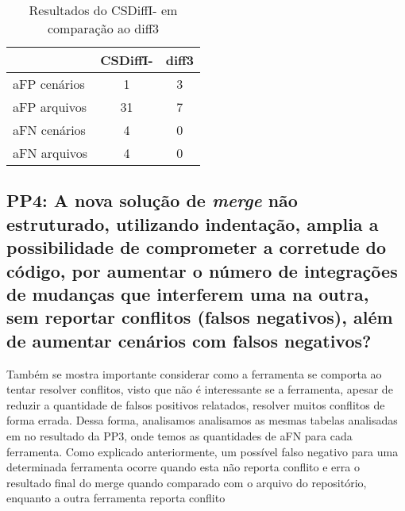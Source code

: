 \begin{table}[ht]
	\begin{center}
		\begin{tabular}{|l|c|c|}
			\hline
			\textbf{ }   & \textbf{CSDiffI-} & \textbf{diff3} \\
			\hline
			aFP cenários & 1                 & 3              \\
			aFP arquivos & 31                & 7              \\
			aFN cenários & 4                 & 0              \\
			aFN arquivos & 4                 & 0              \\
			\hline
		\end{tabular}
	\end{center}
	\caption{Resultados do CSDiffI- em comparação ao diff3}\label{csdiff_indentation_minus_afp_afn}
\end{table}


\subsection{PP4: A nova solução de \emph{merge} não estruturado, utilizando indentação,
	amplia a possibilidade de comprometer a corretude do código, por aumentar o número de
	integrações de mudanças que interferem uma na outra, sem reportar conflitos (falsos negativos),
	além de aumentar cenários com falsos negativos?}
Também se mostra importante considerar como a ferramenta se comporta ao tentar resolver conflitos, visto que não é interessante
se a ferramenta, apesar de reduzir a quantidade de falsos positivos relatados, resolver muitos conflitos de forma errada.
Dessa forma, analisamos analisamos as mesmas tabelas analisadas em no resultado da PP3, onde temos as quantidades de aFN para cada
ferramenta. Como explicado anteriormente,
um possível falso negativo para uma determinada ferramenta ocorre quando esta não reporta
conflito e erra o resultado final do merge quando comparado com o arquivo do repositório,
enquanto a outra ferramenta reporta conflito

